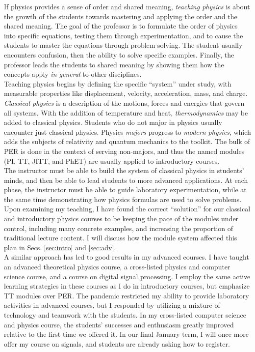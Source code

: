\documentclass[../../../main.tex]{subfiles}
\begin{document}
If physics provides a sense of order and shared meaning, \textit{teaching physics} is about the growth of the students towards mastering and applying the order and the shared meaning.  The goal of the professor is to formulate the order of physics into specific equations, testing them through experimentation, and to cause the students to master the equations through problem-solving.  The student usually encounters confusion, then the ability to solve specific examples.  Finally, the professor leads the students to shared meaning by showing them how the concepts apply \textit{in general} to other disciplines.
\\
\vspace{0.15cm}
Teaching physics begins by defining the specific ``system'' under study, with measurable properties like displacement, velocity, acceleration, mass, and charge.  \textit{Classical physics} is a description of the motions, forces and energies that govern all systems.  With the addition of temperature and heat, \textit{thermodynamics} may be added to classical physics.  Students who do not major in physics usually encounter just classical physics.  Physics \textit{majors} progress to \textit{modern physics}, which adds the subjects of relativity and quantum mechanics to the toolkit.  The bulk of PER is done in the context of serving non-majors, and thus the named modules (PI, TT, JITT, and PhET) are usually applied to introductory courses.
\\
\vspace{0.15cm}
The instructor must be able to build the system of classical physics in students' minds, and then be able to lead students to more advanced applications.  At each phase, the instructor must be able to guide laboratory experimentation, while at the same time demonstrating how physics formulas are used to solve problems.  Upon examining my teaching, I have found the correct ``solution'' for our classical and introductory physics courses to be keeping the pace of the modules under control, including many concrete examples, and increasing the proportion of traditional lecture content.  I will discuss how the module system affected this plan in Secs. \ref{sec:intro} and \ref{sec:adv}.
\\
\vspace{0.15cm}
A similar approach has led to good results in my advanced courses.  I have taught an advanced theoretical physics course, a cross-listed physics and computer science course, and a course on digital signal processing.  I employ the same active learning strategies in these courses as I do in introductory courses, but emphasize TT modules over PER.  The pandemic restricted my ability to provide laboratory activities in advanced courses, but I responded by utilizing a mixture of technology and teamwork with the students.  In my cross-listed computer science and physics course, the students' successes and enthusiasm greatly improved relative to the first time we offered it.  In our final January term, I will once more offer my course on signals, and students are already asking how to register.
\end{document}
